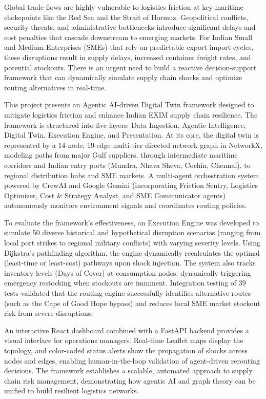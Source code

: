 \vspace{-1cm}

Global trade flows are highly vulnerable to logistics friction at key maritime chokepoints like the Red Sea and the Strait of Hormuz. Geopolitical conflicts, security threats, and administrative bottlenecks introduce significant delays and cost penalties that cascade downstream to emerging markets. For Indian Small and Medium Enterprises (SMEs) that rely on predictable export-import cycles, these disruptions result in supply delays, increased container freight rates, and potential stockouts. There is an urgent need to build a reactive decision-support framework that can dynamically simulate supply chain shocks and optimize routing alternatives in real-time.

This project presents an Agentic AI-driven Digital Twin framework designed to mitigate logistics friction and enhance Indian EXIM supply chain resilience. The framework is structured into five layers: Data Ingestion, Agentic Intelligence, Digital Twin, Execution Engine, and Presentation. At its core, the digital twin is represented by a 14-node, 19-edge multi-tier directed network graph in NetworkX, modeling paths from major Gulf suppliers, through intermediate maritime corridors and Indian entry ports (Mundra, Nhava Sheva, Cochin, Chennai), to regional distribution hubs and SME markets. A multi-agent orchestration system powered by CrewAI and Google Gemini (incorporating Friction Sentry, Logistics Optimizer, Cost \& Strategy Analyst, and SME Communicator agents) autonomously monitors environment signals and coordinates routing policies.

To evaluate the framework's effectiveness, an Execution Engine was developed to simulate 50 diverse historical and hypothetical disruption scenarios (ranging from local port strikes to regional military conflicts) with varying severity levels. Using Dijkstra's pathfinding algorithm, the engine dynamically recalculates the optimal (least-time or least-cost) pathways upon shock injection. The system also tracks inventory levels (Days of Cover) at consumption nodes, dynamically triggering emergency restocking when stockouts are imminent. Integration testing of 39 tests validated that the routing engine successfully identifies alternative routes (such as the Cape of Good Hope bypass) and reduces local SME market stockout risk from severe disruptions.

An interactive React dashboard combined with a FastAPI backend provides a visual interface for operations managers. Real-time Leaflet maps display the topology, and color-coded status alerts show the propagation of shocks across nodes and edges, enabling human-in-the-loop validation of agent-driven rerouting decisions. The framework establishes a scalable, automated approach to supply chain risk management, demonstrating how agentic AI and graph theory can be unified to build resilient logistics networks.

\pagebreak
